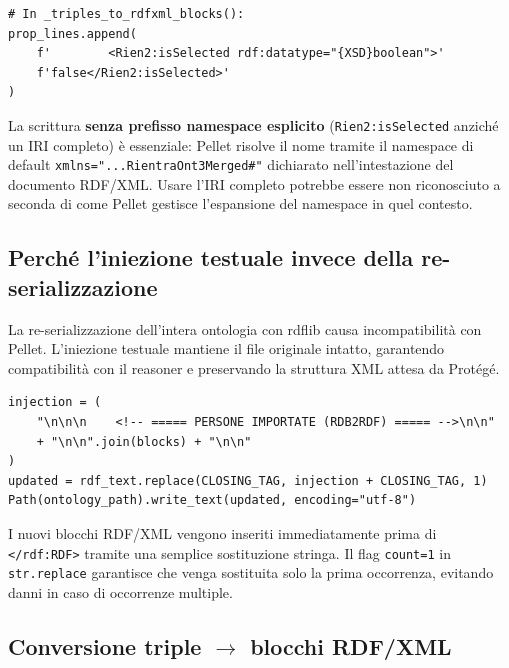 \documentclass[a4paper,12pt]{article}
\begin{document}
\begin{lstlisting}[caption={Scrittura manuale di isSelected compatibile con Pellet.}]
# In _triples_to_rdfxml_blocks():
prop_lines.append(
    f'        <Rien2:isSelected rdf:datatype="{XSD}boolean">'
    f'false</Rien2:isSelected>'
)
\end{lstlisting}

\noindent La scrittura \textbf{senza prefisso namespace esplicito} (\texttt{Rien2:isSelected}
anzich\'{e} un IRI completo) \`{e} essenziale: Pellet risolve il nome tramite
il namespace di default \texttt{xmlns="...RientraOnt3Merged\#"} dichiarato
nell'intestazione del documento RDF/XML. Usare l'IRI completo potrebbe
essere non riconosciuto a seconda di come Pellet gestisce l'espansione
del namespace in quel contesto.

\subsection{Perch\'{e} l'iniezione testuale invece della re-serializzazione}

\begin{infobox}
La re-serializzazione dell'intera ontologia con rdflib causa
incompatibilit\`{a} con Pellet. L'iniezione testuale mantiene il file
originale intatto, garantendo compatibilit\`{a} con il reasoner e
preservando la struttura XML attesa da Prot\'{e}g\'{e}.
\end{infobox}

\begin{lstlisting}[caption={Iniezione testuale dei blocchi RDF/XML prima del tag di chiusura.}]
injection = (
    "\n\n\n    <!-- ===== PERSONE IMPORTATE (RDB2RDF) ===== -->\n\n"
    + "\n\n".join(blocks) + "\n\n"
)
updated = rdf_text.replace(CLOSING_TAG, injection + CLOSING_TAG, 1)
Path(ontology_path).write_text(updated, encoding="utf-8")
\end{lstlisting}

\noindent I nuovi blocchi RDF/XML vengono inseriti immediatamente prima di
\texttt{</rdf:RDF>} tramite una semplice sostituzione stringa. Il flag
\texttt{count=1} in \texttt{str.replace} garantisce che venga sostituita
solo la prima occorrenza, evitando danni in caso di occorrenze multiple.

\subsection{Conversione triple $\rightarrow$ blocchi RDF/XML}
\end{document}
